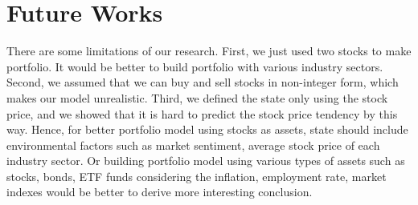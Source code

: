 \chapter{Future Works}
\label{Ch:future}


There are some limitations of our research. First, we just used two stocks to make portfolio. It would be better to build portfolio with various industry sectors. Second, we assumed that we can buy and sell stocks in non-integer form, which makes our model unrealistic. Third, we defined the state only using the stock price, and we showed that it is hard to predict the stock price tendency by this way. Hence, for better portfolio model using stocks as assets, state should include environmental factors such as market sentiment, average stock price of each industry sector. Or building portfolio model using various types of assets such as stocks, bonds, ETF funds considering the inflation, employment rate, market indexes would be better to derive more interesting conclusion.